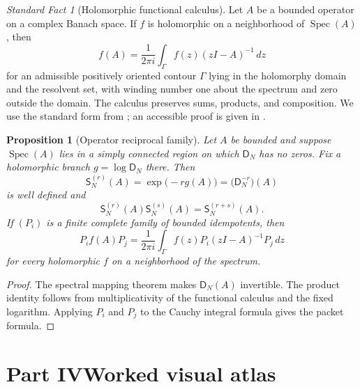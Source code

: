 \documentclass[11pt,letterpaper]{article}
\theoremstyle{plain}
\newtheorem{proposition}[proposition]{Proposition}
\theoremstyle{plain}
\theoremstyle{plain}
\theoremstyle{definition}
\theoremstyle{definition}
\theoremstyle{definition}
\theoremstyle{definition}
\theoremstyle{definition}
\theoremstyle{remark}
\theoremstyle{remark}
\theoremstyle{remark}
\theoremstyle{remark}
\theoremstyle{remark}
\newcommand{\Spec}{\operatorname{Spec}}
\theoremstyle{remark}
\newtheorem{standardfact}[standardfact]{Standard Fact}
\newcommand{\Dfun}{\mathsf D}
\newcommand{\Sfun}{\mathsf S}
\let\KomorebiPrimitivemathsf\mathsf
\renewcommand{\mathsf}[1]{{\KomorebiPrimitivemathsf{#1}}}
\begin{document}
\begin{standardfact}[Holomorphic functional calculus]\label{migration:record:001}\label{migration:sf:holomorphic_calculus}
Let $A$ be a bounded operator on a complex Banach space.  If $f$ is holomorphic on a neighborhood of $\Spec(A)$, then
\[
f(A)
=
\frac1{2\pi i}\int_\Gamma f(z)(zI-A)^{-1}\,dz
\]
for an admissible positively oriented contour $\Gamma$ lying in the holomorphy domain and the resolvent set, with winding number one about the spectrum and zero outside the domain. The calculus preserves sums, products, and composition.  We use the standard form from \cite{DunfordSchwartz1958}; an accessible proof is given in \cite[Appendix A]{TaylorBanachAlgebras}.
\end{standardfact}

\begin{proposition}[Operator reciprocal family]\label{migration:record:002}\label{migration:prop:operator_reciprocal}
Let $A$ be bounded and suppose $\Spec(A)$ lies in a simply connected region on which $\Dfun_N$ has no zeros.  Fix a holomorphic branch $g=\log\Dfun_N$ there.  Then
\[
\Sfun_N^{(r)}(A)
=
\exp\bigl(-r g(A)\bigr)
=
\bigl(\Dfun_N^{-r}\bigr)(A)
\]
is well defined and
\[
\Sfun_N^{(r)}(A)\Sfun_N^{(s)}(A)
=
\Sfun_N^{(r+s)}(A).
\]
If $(P_i)$ is a finite complete family of bounded idempotents, then
\[
P_i f(A)P_j
=
\frac1{2\pi i}
\int_\Gamma
f(z)P_i(zI-A)^{-1}P_j\,dz
\]
for every holomorphic $f$ on a neighborhood of the spectrum.
\end{proposition}

\begin{proof}
The spectral mapping theorem makes $\Dfun_N(A)$ invertible.  The product identity follows from multiplicativity of the functional calculus and the fixed logarithm.  Applying $P_i$ and $P_j$ to the Cauchy integral formula gives the packet formula.
\end{proof}


\clearpage
\part*{Part IV\quad Worked visual atlas}

\clearpage
\end{document}
